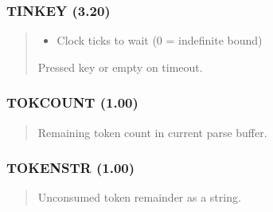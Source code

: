 \documentclass[letterpaper,10pt,english]{sphinxmanual}
\begin{document}
\subsubsection{TINKEY (3.20)}
\label{\detokenize{ppl:id7}}\begin{quote}

\sphinxAtStartPar
{}
\begin{description}
\begin{itemize}
\item {} 
\sphinxAtStartPar
{} \textendash{} Clock ticks to wait (0 = indefinite bound)

\end{itemize}

\sphinxAtStartPar
Pressed key or empty on timeout.

\end{description}
\end{quote}


\subsubsection{TOKCOUNT (1.00)}
\label{\detokenize{ppl:tokcount-1-00}}\begin{quote}

\sphinxAtStartPar
{}
\begin{description}
\sphinxAtStartPar
Remaining token count in current parse buffer.

\end{description}
\end{quote}


\subsubsection{TOKENSTR (1.00)}
\label{\detokenize{ppl:tokenstr-1-00}}\begin{quote}

\sphinxAtStartPar
{}
\begin{description}
\sphinxAtStartPar
Unconsumed token remainder as a string.

\end{description}
\end{quote}
\end{document}
